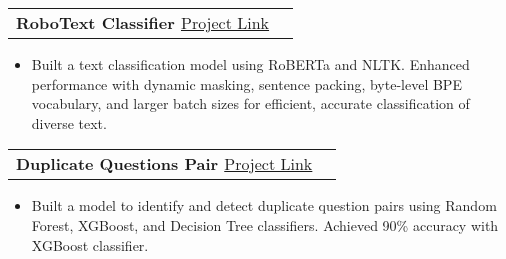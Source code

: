 \documentclass[letterpaper,11pt]{article}
\makeatletter
\newcommand{\resumeItem}[1]{
	\item\small{
		{#1 \vspace{-2pt}}
	}
}
\newcommand{\resumeProjectHeading}[1]{
	\item
	\begin{tabular*}{1.001\textwidth}{l@{\extracolsep{\fill}}r}
		\small#1 & \\
	\end{tabular*}\vspace{-7pt}
}
\newcommand{\resumeItemListStart}{\begin{itemize}}
\newcommand{\resumeItemListEnd}{\end{itemize}\vspace{-5pt}}
\makeatother
\begin{document}
		\resumeProjectHeading
	{\textbf{\large{{RoboText Classifier }}}\href{https://github.com/Dawoodsarfraz/RoboText-Classifier}{\normalsize{\color{blue} Project Link}}}
	\resumeItemListStart
	\resumeItem{\normalsize Built a text classification model using RoBERTa and NLTK. Enhanced performance with dynamic masking, sentence packing, byte-level BPE vocabulary, and larger batch sizes for efficient, accurate classification of diverse text.}
	\resumeItemListEnd
	\vspace{-15pt}
	
	
	\resumeProjectHeading
	{\textbf{\large{{Duplicate Questions Pair }}}\href{https://github.com/Dawoodsarfraz/duplicate-questions-pair}{\normalsize{\color{blue} Project Link}}}
	\resumeItemListStart
	\resumeItem{\normalsize Built a model to identify and detect duplicate question pairs using Random Forest, XGBoost, and Decision Tree classifiers. Achieved 90\% accuracy with XGBoost classifier.}
	\resumeItemListEnd
	\vspace{-15pt}
	
    
\end{document}
